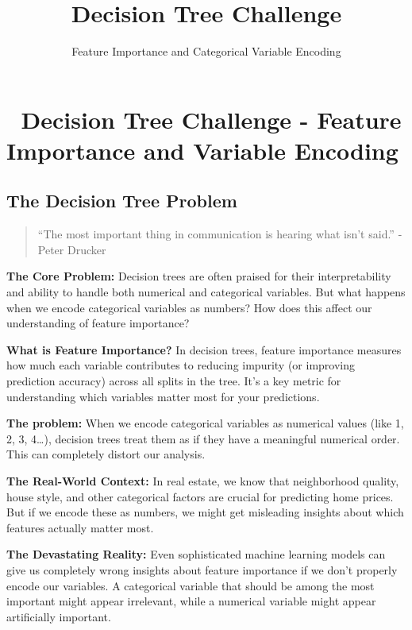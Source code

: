 \documentclass[
  letterpaper,
  DIV=11,
  numbers=noendperiod]{scrartcl}
\title{Decision Tree Challenge}
\subtitle{Feature Importance and Categorical Variable Encoding}
\author{}
\date{}
\begin{document}
\maketitle


\section{🌳 Decision Tree Challenge - Feature Importance and Variable
Encoding}\label{decision-tree-challenge---feature-importance-and-variable-encoding}

\subsection{The Decision Tree Problem
🎯}\label{the-decision-tree-problem}

\begin{quote}
``The most important thing in communication is hearing what isn't
said.'' - Peter Drucker
\end{quote}

\textbf{The Core Problem:} Decision trees are often praised for their
interpretability and ability to handle both numerical and categorical
variables. But what happens when we encode categorical variables as
numbers? How does this affect our understanding of feature importance?

\textbf{What is Feature Importance?} In decision trees, feature
importance measures how much each variable contributes to reducing
impurity (or improving prediction accuracy) across all splits in the
tree. It's a key metric for understanding which variables matter most
for your predictions.

\begin{tcolorbox}[enhanced jigsaw, left=2mm, rightrule=.15mm, coltitle=black, title=\textcolor{quarto-callout-important-color}{\faExclamation}\hspace{0.5em}{🎯 The Key Insight: Encoding Matters for Interpretability}, leftrule=.75mm, opacityback=0, opacitybacktitle=0.6, breakable, bottomrule=.15mm, bottomtitle=1mm, colback=white, colbacktitle=quarto-callout-important-color!10!white, colframe=quarto-callout-important-color-frame, arc=.35mm, titlerule=0mm, toptitle=1mm, toprule=.15mm]

\textbf{The problem:} When we encode categorical variables as numerical
values (like 1, 2, 3, 4\ldots), decision trees treat them as if they
have a meaningful numerical order. This can completely distort our
analysis.

\textbf{The Real-World Context:} In real estate, we know that
neighborhood quality, house style, and other categorical factors are
crucial for predicting home prices. But if we encode these as numbers,
we might get misleading insights about which features actually matter
most.

\textbf{The Devastating Reality:} Even sophisticated machine learning
models can give us completely wrong insights about feature importance if
we don't properly encode our variables. A categorical variable that
should be among the most important might appear irrelevant, while a
numerical variable might appear artificially important.

\end{tcolorbox}
\end{document}

